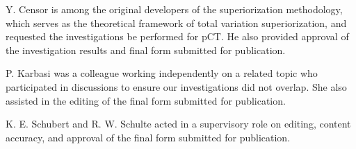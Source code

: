 {\begin{attributionList}
\begin{authorList}
        \item Y. Censor is among the original developers of the superiorization methodology, which serves as the theoretical framework of total variation superiorization, and requested the investigations be performed for pCT. He also provided approval of the investigation results and final form submitted for publication.
        \item P. Karbasi was a colleague working independently on a related topic who participated in discussions to ensure our investigations did not overlap. She also assisted in the editing of the final form submitted for publication.
        \item K. E. Schubert and R. W. Schulte acted in a supervisory role on editing, content accuracy, and approval of the final form submitted for publication.%
    \end{authorList}%
\end{attributionList}
}
\endinput
